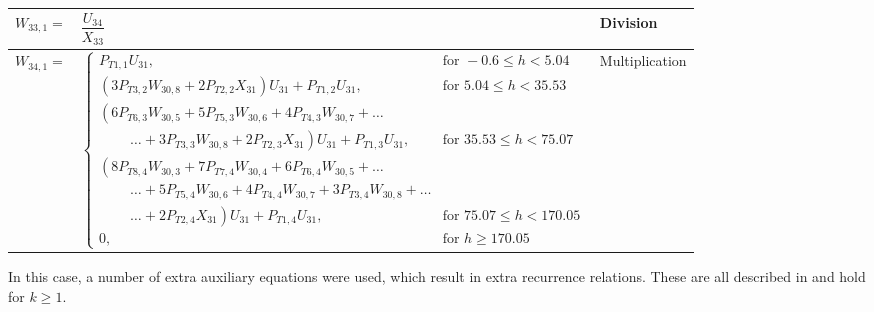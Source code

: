 {\begin{longtable}{|p{1.5cm}|l|p{2cm}|}
$W_{33,1}=$ & $ \dfrac{U_{34}}{X_{33}} $ & Division \\ \hline
$W_{34,1}=$ & $ 
\begin{cases}
P_{T 1,1}U_{31}, & \text{for } -0.6 \leq h < 5.04  \\
\left(3P_{T 3,2}W_{30,8}+2P_{T 2,2}X_{31}\right)U_{31}+P_{T 1,2}U_{31}, &  \text{for } 5.04\leq h < 35.53   \\
\left(6 P_{T 6,3}W_{30,5}+5P_{T 5,3}W_{30,6}+4P_{T 4,3}W_{30,7}+ \dots
\right. \\
\qquad\  \left. \dotsc +3P_{T 3,3}W_{30,8}+2P_{T 2,3}X_{31}\right)U_{31}+P_{T 1,3}U_{31}, &  \text{for } 35.53\leq h < 75.07   \\
\left(8 P_{T 8,4}W_{30,3}+7P_{T 7,4}W_{30,4}+6P_{T 6,4}W_{30,5}
+ \dots \right. \\
\qquad\  \left. \dotsc +5P_{T 5,4}W_{30,6}+4P_{T 4,4}W_{30,7}+3P_{T 3,4}W_{30,8}+ \dots \right. \\
\qquad\  \left. \dotsc +2P_{T 2,4}X_{31}\right)U_{31}+P_{T 1,4}U_{31}, &  \text{for } 75.07\leq h < 170.05   \\
0, &  \text{for }  h \geq 170.05   
\end{cases}
 $ & Multiplication \\ \hline


\end{longtable}
}


\noindent
In this case, a number of extra auxiliary equations were used, which result in extra recurrence relations. These are all described in  and hold for $k\geq 1$.

